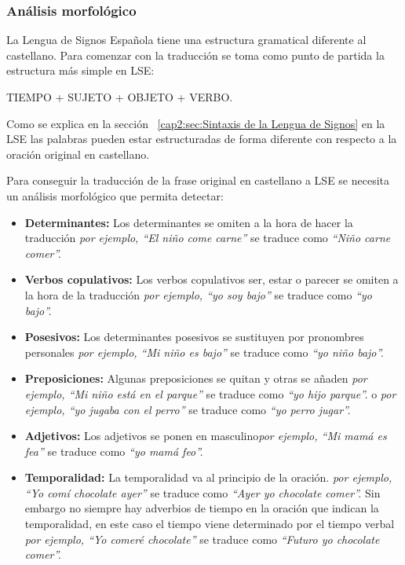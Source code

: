 \subsubsection{Análisis morfológico} 

La Lengua de Signos Española tiene una estructura gramatical diferente al castellano. Para comenzar con la traducción se toma como punto de partida la estructura más simple en LSE: 
\begin{center}
	TIEMPO + SUJETO + OBJETO + VERBO.
\end{center}

Como se explica en la sección ~\ref {cap2:sec:Sintaxis de la Lengua de Signos} en la LSE las palabras pueden estar estructuradas de forma diferente con respecto a la oración original en castellano.


Para conseguir la traducción de la frase original en castellano a LSE se necesita un análisis morfológico que permita detectar:

\begin{itemize}
	
	\item \textbf{Determinantes:} Los determinantes se omiten a la hora de hacer la traducción \textit{por ejemplo, ``El niño come carne''} se traduce como \textit{``Niño carne comer''.}
	
	\item \textbf{Verbos copulativos:} Los verbos copulativos ser, estar o parecer se omiten a la hora de la traducción \textit{por ejemplo, ``yo soy bajo''} se traduce como \textit{``yo bajo''.}
	
	\item \textbf{Posesivos:} Los determinantes posesivos se sustituyen por pronombres personales \textit{por ejemplo, ``Mi niño es bajo''} se traduce como \textit{``yo niño bajo''.}
	
	\item \textbf{Preposiciones:} Algunas preposiciones se quitan y otras se añaden \textit{por ejemplo, ``Mi niño está en el parque''} se traduce como \textit{``yo hijo parque''.} o \textit{por ejemplo, ``yo jugaba con el perro''} se traduce como \textit{``yo perro jugar''.}
	
	\item \textbf{Adjetivos:} Los adjetivos se ponen en masculino\textit{por ejemplo, ``Mi mamá es fea''} se traduce como \textit{``yo mamá feo''.}
	
	\item \textbf{Temporalidad:} La temporalidad va al principio de la oración. \textit{por ejemplo, ``Yo comí chocolate ayer''} se traduce como \textit{``Ayer yo chocolate comer''.} Sin embargo no siempre hay adverbios de tiempo en la oración que indican la temporalidad, en este caso el tiempo viene determinado por el tiempo verbal \textit{por ejemplo, ``Yo comeré chocolate''} se traduce como \textit{``Futuro yo chocolate comer''.}
	

	
\end{itemize}


